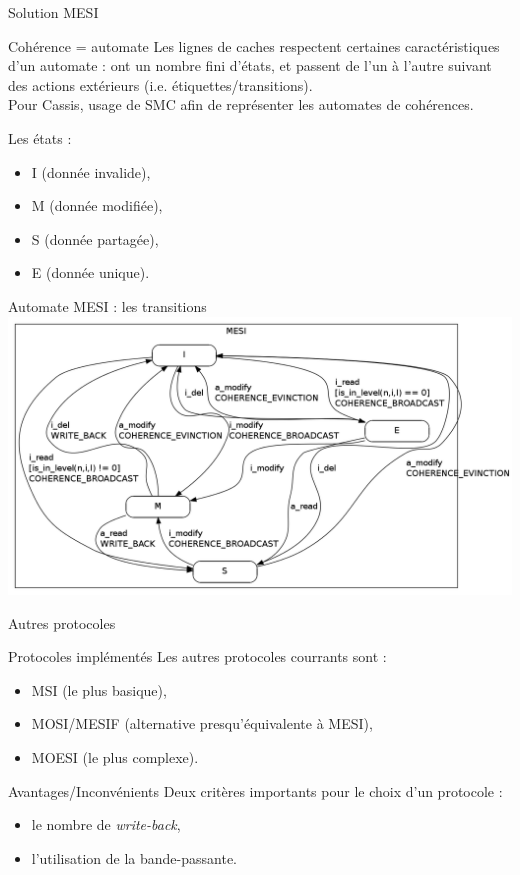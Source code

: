 \begin{frame}{Solution MESI}
  \begin{block}{Cohérence = automate}
    Les lignes de caches respectent certaines caractéristiques d'un automate : ont un nombre fini d'états, et passent de l'un à l'autre suivant des actions extérieurs (i.e. étiquettes/transitions).\\
    Pour \textsf{Cassis}, usage de \textsf{SMC} afin de représenter les automates de cohérences.
  \end{block}
  
  \begin{block}{Les états :}
    \begin{itemize}
    \item{I (donnée invalide),}
    \item{M (donnée modifiée),}
    \item{S (donnée partagée),}
    \item{E (donnée unique).}
    \end{itemize}
  \end{block}
\end{frame}

\begin{frame}{Automate MESI : les transitions}
    \includegraphics[scale=.3]{images/MESI_simple.png}
\end{frame}

\begin{frame}{Autres protocoles}
  \begin{block}{Protocoles implémentés}
    Les autres protocoles courrants sont :
    \begin{itemize}
    \item{MSI (le plus basique),}
    \item{MOSI/MESIF (alternative presqu'équivalente à MESI),}
    \item{MOESI (le plus complexe).}
    \end{itemize}
  \end{block}
  
  \begin{block}{Avantages/Inconvénients}
    Deux critères importants pour le choix d'un protocole :
    \begin{itemize}
    \item{le nombre de \emph{write-back},}
    \item{l'utilisation de la bande-passante.}
    \end{itemize}
  \end{block}
\end{frame}

